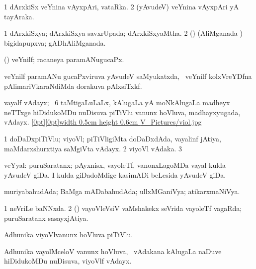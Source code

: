 {{{{{{{{\bentry
{} 
\gl{\nA}
\expl{}
\bmng
\bnum
\num{1} dArxkiSx veYnina vAyxpAri, vataRka. 
\num{2} (yAvudeV) veYnina vAyxpAri yA tayAraka. 
\enum
\emng
\eentry

\bentry
{} 
\gl{\gu}
\expl{}
\bmng
\bnum
\num{1} dArxkiSxya; dArxkiSxya savxrUpada; dArxkiSxyaMtha. 
\num{2} (\rUpa) (AliMganada \vi) bigidapupxva; gADhAliMganada. 
\enum
\emng
\eentry

\bentry
{} 
\gl{\gu}
\expl{}
\bmng
 (\ravi) veYnilf;  racaneya paramANugucaPx. 
\emng
\eentry

\bentry
{} 
\gl{\nA}
\expl{}
\bmng
 veYnilf paramANu gucaPxviruva yAvudeV saMyukatxda, \kanmu\ veYnilf kolxVreYDfna pAlimariVkaraNdiMda dorakuva pAlxsiTxkf. 
\emng
\eentry

\bentry
{} 
\gl{\nA}
\expl{}
\bmng
 vayalf vAdayx; \sA\ $6$ taMtigaLuLaLx, kAlugaLa yA moNkAlugaLa madheyx neTTxge hiDidukoMDu nuDisuva piTiVlu \mo vanunx hoVluva, \hfill\break madhayxyugada, vAdayx. \qquad \hyperlink{violfigure}{\raisebox{-0.25cm}[0pt][0pt]{\pdfimage width 0.5cm height 0.6cm {V_Pictures/viol.jpg}}} 
\emng
\eentry

\bentry
{} 
\gl{\nA}
\expl{}
\bmng
\bnum
\num{1} doDaDxpiTiVlu; viyoVl; piTiVligiMta doDaDxdAda, vayalinf jAtiya, maMdarxshurxtiya saMgiVta vAdayx. 
\num{2} viyoVl vAdaka. 
\num{3}  
\enum
\emng
\eentry

\bentry
{} 
\gl{\nA}
\expl{}
\bmng
 veYyal: 
\banum
{} puruSaratanx; pAyxnisx, vayoleTf, \mo vanonxLagoMDa vayal kulda yAvudeV giDa. 
 I kulda giDadoMdige kasimADi beLesida yAvudeV giDa. 
\eanum
\emng
\eentry

\bentry
{} 
\gl{\gu}
\expl{}
\bmng
 muriyabahudAda; BaMga mADabahudAda; ullxMGaniVya; atikarxmaNiVya. 
\emng
\eentry

\bentry
{} 
\gl{\gu}
\expl{}
\bmng
\bnum
\num{1} neVriLe baNNxda. 
\num{2} (\savi) vayoVleVsiV vaMshakekx seVrida vayoleTf vagaRda; puruSaratanx sasayxjAtiya. 
\enum
\emng
\eentry

\bentry
{} 
\gl{\nA}
\expl{}
\bmng
 Adhunika viyoVlvanunx hoVluva piTiVlu. 
\emng
\eentry

\bentry
{} 
\gl{\nA}
\expl{}
\bmng
 Adhunika vayolMceloV  vanunx hoVluva, \kanmu\ vAdakana kAlugaLa naDuve hiDidukoMDu nuDisuva, viyoVlf vAdayx. 
\emng
\eentry

}}}}}}}}
